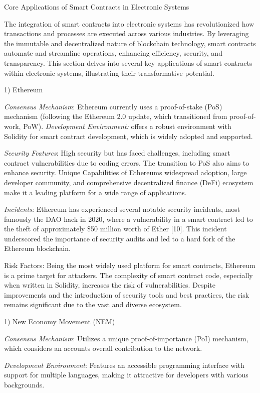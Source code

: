 Core Applications of Smart Contracts in Electronic Systems

The integration of smart contracts into electronic systems has
revolutionized how transactions and processes are executed across
various industries. By leveraging the immutable and decentralized nature
of blockchain technology, smart contracts automate and streamline
operations, enhancing efficiency, security, and transparency. This
section delves into several key applications of smart contracts within
electronic systems, illustrating their transformative potential.

1) Ethereum

\emph{Consensus Mechanism}: Ethereum currently uses a proof-of-stake
(PoS) mechanism (following the Ethereum 2.0 update, which transitioned
from proof-of-work, PoW). \emph{Development Environment:} offers a
robust environment with Solidity for smart contract development, which
is widely adopted and supported.

\emph{Security Features}: High security but has faced challenges,
including smart contract vulnerabilities due to coding errors. The
transition to PoS also aims to enhance security. Unique Capabilities of
Ethereum\textquotesingle s widespread adoption, large developer
community, and comprehensive decentralized finance (DeFi) ecosystem make
it a leading platform for a wide range of applications.

\emph{Incidents:} Ethereum has experienced several notable security
incidents, most famously the DAO hack in 2020, where a vulnerability in
a smart contract led to the theft of approximately \$50 million worth of
Ether {[}10{]}. This incident underscored the importance of security
audits and led to a hard fork of the Ethereum blockchain.

Risk Factors: Being the most widely used platform for smart contracts,
Ethereum is a prime target for attackers. The complexity of smart
contract code, especially when written in Solidity, increases the risk
of vulnerabilities. Despite improvements and the introduction of
security tools and best practices, the risk remains significant due to
the vast and diverse ecosystem.

1) New Economy Movement (NEM)

\emph{Consensus Mechanism}: Utilizes a unique proof-of-importance (PoI)
mechanism, which considers an account\textquotesingle s overall
contribution to the network.

\emph{Development Environment}: Features an accessible programming
interface with support for multiple languages, making it attractive for
developers with various backgrounds.


